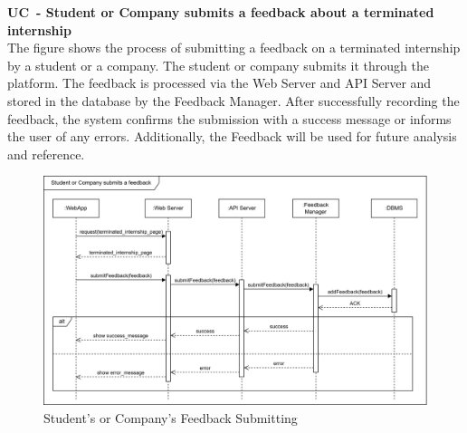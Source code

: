 \textbf{UC\cuc\  - Student or Company submits a feedback about a terminated internship} \\
The figure shows the process of submitting a feedback on a terminated internship by a student or a company. The student or company submits it through the platform. The feedback is processed via the Web Server and API Server and stored in the database by the Feedback Manager. After successfully recording the feedback, the system confirms the submission with a success message or informs the user of any errors. Additionally, the Feedback will be used for future analysis and reference.
\begin{center}
    \begin{figure}[H]
        \centering
        \includegraphics[width=1\linewidth]{Images/Sequence diagrams/UC15.png}
        \caption{Student's or Company's Feedback Submitting}
        \label{fig:enter-label}
    \end{figure}
\end{center}

